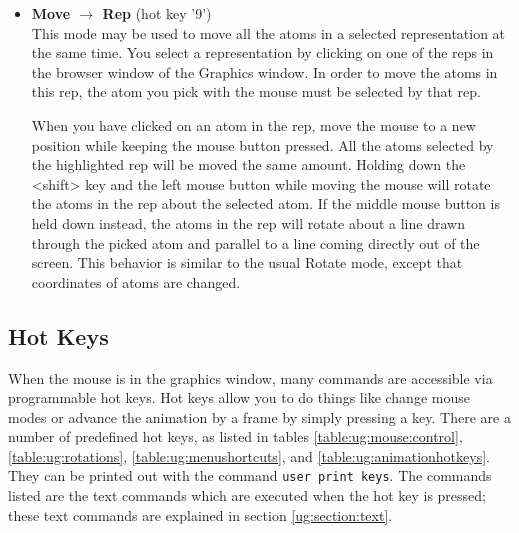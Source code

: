 \begin{itemize}
\item {\bf Move $\rightarrow$ Rep} 
\hspace{0.2in} (hot key '9')
\\
This mode may be used to move all the atoms in a selected representation at
the same time.  You select a representation by clicking on one of the reps
in the browser window of the Graphics window.  In order to move the atoms in 
this rep, the atom you pick with the mouse must be selected by that rep.

When you have clicked on an atom in the rep, move the mouse to a new position
while  keeping the mouse button pressed.  All the atoms selected by the 
highlighted rep will be moved the same amount.  
Holding down the <shift> key and the left mouse button while moving the mouse
will rotate the atoms in the rep about the selected atom.  If the middle
mouse button is held down instead, the atoms in the rep will rotate about
a line drawn through the picked atom and parallel to a line coming directly
out of the screen.  This behavior is similar to the usual Rotate mode, except
that coordinates of atoms are changed. 

\end{itemize}


\subsection{Hot Keys}
\label{ug:ui:hotkeys}

When the mouse is in the graphics window, many commands are
accessible via programmable hot keys.  Hot keys allow you to do things
like change mouse modes or advance the animation by a frame by simply
pressing a key.  
There are a number of predefined hot keys,
as listed in tables \ref{table:ug:mouse:control},
\ref{table:ug:rotations}, \ref{table:ug:menushortcuts},
and \ref{table:ug:animationhotkeys}.
They can be printed out with the command {\tt user print keys}.
The commands listed are the text commands which are executed
when the hot key is pressed; these text commands are explained in
section \ref{ug:section:text}.  

